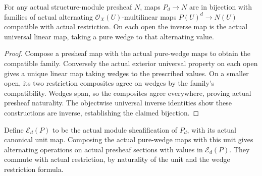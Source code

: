 \begin{theorem}
\label{sc0-canonical-port:ext:exterior-presheaf-universal}
\leanok
For any actual structure-module presheaf \(N\), maps
\(P_d\to N\) are in bijection with families of actual
alternating \(\mathcal O_X(U)\)-multilinear maps
\(P(U)^d\to N(U)\) compatible with actual restriction.
On each open the inverse map is the actual universal
linear map, taking a pure wedge to that alternating value.
\end{theorem}
\begin{proof}
Compose a presheaf map with the actual pure-wedge maps
to obtain the compatible family. Conversely the actual
exterior universal property on each open gives a unique
linear map taking wedges to the prescribed values.
On a smaller open, its two restriction composites
agree on wedges by the family's compatibility.
Wedges span, so the composites agree everywhere,
proving actual presheaf naturality. The objectwise
universal inverse identities show these constructions
are inverse, establishing the claimed bijection.
\end{proof}

\begin{definition}
\label{sc0-canonical-port:ext:exterior-sheaf}
\leanok
Define \(\mathcal E_d(P)\) to be the actual module
sheafification of \(P_d\), with its actual canonical
unit map. Composing the actual pure-wedge maps with
this unit gives alternating operations on actual
presheaf sections with values in \(\mathcal E_d(P)\).
They commute with actual restriction, by naturality
of the unit and the wedge restriction formula.
\end{definition}

